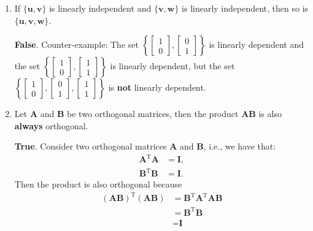 \documentclass{exam}
\begin{document}
\begin{enumerate}

	\item If $\{\textbf{u},\textbf{v}\}$ is linearly independent and $\{\textbf{v},\textbf{w}\}$ is linearly independent, then so is $\{\textbf{u},\textbf{v},\textbf{w}\}$.
	
	\begin{solutionorbox}[2in] \textbf{False}.
		Counter-example: The set $\left\{\begin{bmatrix} 1 \\ 0\end{bmatrix},\begin{bmatrix} 0 \\ 1\end{bmatrix}\right\}$ is linearly dependent and the set $\left\{\begin{bmatrix} 1 \\ 0\end{bmatrix},\begin{bmatrix} 1 \\ 1\end{bmatrix}\right\}$ is linearly dependent, but the set $\left\{\begin{bmatrix} 1 \\ 0\end{bmatrix},\begin{bmatrix} 0 \\ 1\end{bmatrix},\begin{bmatrix} 1 \\ 1\end{bmatrix}\right\}$ is \textbf{not} linearly dependent.
	\end{solutionorbox}

    \item Let $\textbf{A}$ and $\textbf{B}$ be two orthogonal matrices, then the product $\textbf{A}\textbf{B}$ is also \textbf{always} orthogonal.	
	
	\begin{solutionorbox}[2in] \textbf{True}.
		Consider two orthogonal matrices $\textbf{A}$ and $\textbf{B}$, i.e., we have that:
			\begin{align*}
				\textbf{A}^\text{T}\textbf{A} &= \textbf{I}, \\
				\textbf{B}^\text{T}\textbf{B} &= \textbf{I}. 
			\end{align*}
		Then the product is also orthogonal because
			\begin{align*}
				(\textbf{A}\textbf{B})^\text{T}(\textbf{A}\textbf{B}) &= \textbf{B}^\text{T}\textbf{A}^\text{T}\textbf{A}\textbf{B} \\
				&= \textbf{B}^\text{T}\textbf{B}\\
				&= \textbf{I}
			\end{align*}
	\end{solutionorbox}


\end{enumerate}
\end{document}

